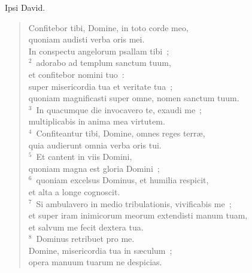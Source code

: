 \lettrine[lines=3,image=true,loversize=0.05,lraise=-0.03]{I}{}psi David. \begin{flushleft}\begin{verse}\vspace{6pt}Confitebor tibi, Domine, in toto corde meo,\\ quoniam audisti verba oris mei.\\ In conspectu angelorum psallam tibi~;\\
${}^{2}$~adorabo ad templum sanctum tuum,\\ et confitebor nomini tuo~:\\ super misericordia tua et veritate tua~;\\ quoniam magnificasti super omne, nomen sanctum tuum.\\
${}^{3}$~In quacumque die invocavero te, exaudi me~;\\ multiplicabis in anima mea virtutem.\\
${}^{4}$~Confiteantur tibi, Domine, omnes reges terr\ae ,\\ quia audierunt omnia verba oris tui.\\
${}^{5}$~Et cantent in viis Domini,\\ quoniam magna est gloria Domini~;\\
${}^{6}$~quoniam excelsus Dominus, et humilia respicit,\\ et alta a longe cognoscit.\\
${}^{7}$~Si ambulavero in medio tribulationis, vivificabis me~;\\ et super iram inimicorum meorum extendisti manum tuam,\\ et salvum me fecit dextera tua.\\
${}^{8}$~Dominus retribuet pro me.\\ Domine, misericordia tua in s\ae culum~;\\ opera manuum tuarum ne despicias.\end{verse}\end{flushleft}



